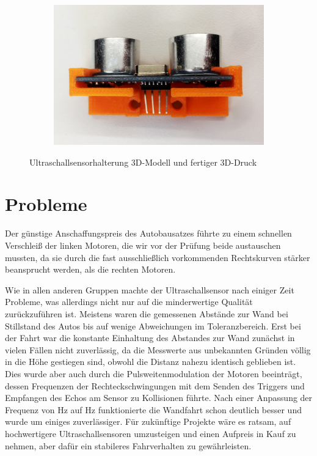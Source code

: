 \documentclass[a4paper, 12pt]{scrartcl}
\begin{document}
\begin{figure}[H]
\begin{subfigure}{.5\textwidth}
	\end{subfigure}%
	\begin{subfigure}{.5\textwidth}
		\centering
		\includegraphics[width=\textwidth]{../bilder_videos/Sensorhalterung_Top.png}
	\end{subfigure}%
	\caption{Ultraschallsensorhalterung 3D-Modell und fertiger 3D-Druck}
\end{figure}

\section{Probleme}
Der günstige Anschaffungspreis des Autobausatzes führte zu einem schnellen Verschleiß der linken Motoren, die wir vor der Prüfung beide austauschen mussten, da sie durch die fast ausschließlich vorkommenden Rechtskurven stärker beansprucht werden, als die rechten Motoren.

Wie in allen anderen Gruppen machte der Ultraschallsensor nach einiger Zeit Probleme, was allerdings nicht nur auf die minderwertige Qualität zurückzuführen ist. Meistens waren die gemessenen Abstände zur Wand bei Stillstand des Autos bis auf wenige Abweichungen im Toleranzbereich. Erst bei der Fahrt war die konstante Einhaltung des Abstandes zur Wand zunächst in vielen Fällen nicht zuverlässig, da die Messwerte aus unbekannten Gründen völlig in die Höhe gestiegen sind, obwohl die Distanz nahezu identisch geblieben ist. Dies wurde aber auch durch die Pulsweitenmodulation der Motoren beeinträgt, dessen Frequenzen der Rechteckschwingungen mit dem Senden des Triggers und Empfangen des Echos am Sensor zu Kollisionen führte. Nach einer Anpassung der Frequenz von \unit[70]{Hz} auf \unit[73]{Hz} funktionierte die Wandfahrt schon deutlich besser und wurde um einiges zuverlässiger. Für zukünftige Projekte wäre es ratsam, auf hochwertigere Ultraschallsensoren umzusteigen und einen Aufpreis in Kauf zu nehmen, aber dafür ein stabileres Fahrverhalten zu gewährleisten.
\end{document}
